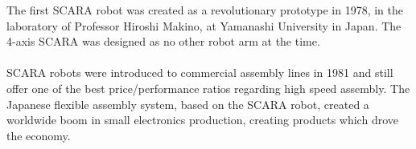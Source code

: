 The first SCARA robot was created as a revolutionary prototype in 1978, in the laboratory of Professor Hiroshi Makino, at Yamanashi University in Japan. The 4-axis SCARA was designed as no other robot arm at the time.
\\
\\
SCARA robots were introduced to commercial assembly lines in 1981 and still offer one of the best price/performance ratios regarding high speed assembly. The Japanese flexible assembly system, based on the SCARA robot, created a worldwide boom in small electronics production, creating products which drove the economy.
\cite{RHOF}
